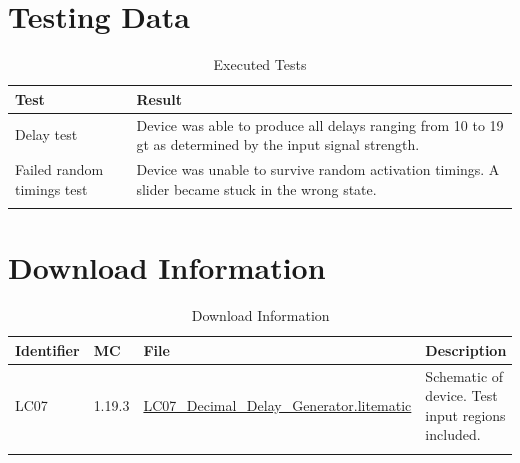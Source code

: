 \documentclass[10pt]{datasheet}
\begin{document}
\section{Testing Data}
\begin{table}[h]
\caption{Executed Tests}
\begin{tabularx}{\textwidth}{l | X}
    \thickhline
    \textbf{Test} & \textbf{Result} \\
    \hline
    Delay test & Device was able to produce all delays ranging from 10 to 19 gt as determined by the input signal strength.\\
    \hline
    Failed random timings test & Device was unable to survive random activation timings. A slider became stuck in the wrong state.\\
    \thickhline
\end{tabularx}
\end{table}

\section{Download Information}
\begin{table}[h]
    \caption{Download Information}
    \begin{tabularx}{\textwidth}{l | l | l | X}
        \thickhline
        \textbf{Identifier} & \textbf{MC} & \textbf{File} & \textbf{Description} \\
        \hline
        LC07 & 1.19.3 & \href{https://github.com/Soontech-Annals/Archive/blob/8413f90a054b6c415703bae02badeba7541344f6/Archive/logic-and-computation/LC07\%20Decimal\%20Delay\%20Generator/LC07\_Decimal\_Delay\_Generator.litematic?raw=1}{LC07\_Decimal\_Delay\_Generator.litematic} & Schematic of device. Test input regions included. \\
        \hline
        \thickhline
    \end{tabularx}
\end{table}
\end{document}
